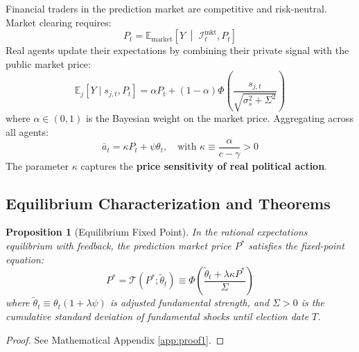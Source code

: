\documentclass[12pt]{article}
\newtheorem{proposition}{Proposition}
\begin{document}
Financial traders in the prediction market are competitive and risk-neutral. Market clearing requires:
\begin{equation}
P_t = \mathbb{E}_{\text{market}}\left[ Y \;\middle|\; \mathcal{I}_t^{\text{mkt}}, P_t \right]
\end{equation}
Real agents update their expectations by combining their private signal with the public market price:
\begin{equation}
\mathbb{E}_j[Y \mid s_{j,t}, P_t] = \alpha P_t + (1 - \alpha) \Phi\left( \frac{s_{j,t}}{\sqrt{\sigma_s^2 + \Sigma^2}} \right)
\end{equation}
where $\alpha \in (0, 1)$ is the Bayesian weight on the market price. Aggregating across all agents:
\begin{equation}
\bar{a}_t = \kappa P_t + \psi \theta_t, \quad \text{with } \kappa \equiv \frac{\alpha}{c - \gamma} > 0
\end{equation}
The parameter $\kappa$ captures the \textbf{price sensitivity of real political action}.

\subsection{Equilibrium Characterization and Theorems}

\begin{proposition}[Equilibrium Fixed Point]
\label{prop:fixed_point}
In the rational expectations equilibrium with feedback, the prediction market price $P^*$ satisfies the fixed-point equation:
\begin{equation}
\label{eq:fixed_point}
P^* = \mathcal{T}(P^*; \tilde{\theta}_t) \equiv \Phi\left( \frac{\tilde{\theta}_t + \lambda \kappa P^*}{\Sigma} \right)
\end{equation}
where $\tilde{\theta}_t \equiv \theta_t(1 + \lambda \psi)$ is adjusted fundamental strength, and $\Sigma > 0$ is the cumulative standard deviation of fundamental shocks until election date $T$.
\end{proposition}
\begin{proof}
See Mathematical Appendix \ref{app:proof1}.
\end{proof}
\end{document}
